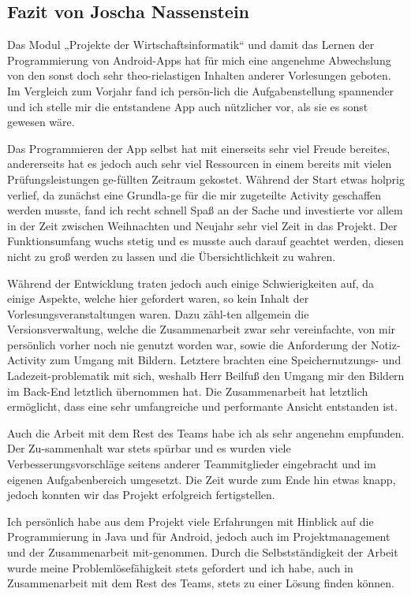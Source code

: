 \subsection{Fazit von Joscha Nassenstein}

Das Modul „Projekte der Wirtschaftsinformatik“ und damit das Lernen der Programmierung von Android-Apps hat für mich eine angenehme Abwechslung von den sonst doch sehr theo-rielastigen Inhalten anderer Vorlesungen geboten. Im Vergleich zum Vorjahr fand ich persön-lich die Aufgabenstellung spannender und ich stelle mir die entstandene App auch nützlicher vor, als sie es sonst gewesen wäre.

Das Programmieren der App selbst hat mit einerseits sehr viel Freude bereites, andererseits hat es jedoch auch sehr viel Ressourcen in einem bereits mit vielen Prüfungsleistungen ge-füllten Zeitraum gekostet. Während der Start etwas holprig verlief, da zunächst eine Grundla-ge für die mir zugeteilte Activity geschaffen werden musste, fand ich recht schnell Spaß an der Sache und investierte vor allem in der Zeit zwischen Weihnachten und Neujahr sehr viel Zeit in das Projekt. Der Funktionsumfang wuchs stetig und es musste auch darauf geachtet werden, diesen nicht zu groß werden zu lassen und die Übersichtlichkeit zu wahren.

Während der Entwicklung traten jedoch auch einige Schwierigkeiten auf, da einige Aspekte, welche hier gefordert waren, so kein Inhalt der Vorlesungsveranstaltungen waren. Dazu zähl-ten allgemein die Versionsverwaltung, welche die Zusammenarbeit zwar sehr vereinfachte, von mir persönlich vorher noch nie genutzt worden war, sowie die Anforderung der Notiz-Activity zum Umgang mit Bildern. Letztere brachten eine Speichernutzungs- und Ladezeit-problematik mit sich, weshalb Herr Beilfuß den Umgang mir den Bildern im Back-End letztlich übernommen hat. Die Zusammenarbeit hat letztlich ermöglicht, dass eine sehr umfangreiche und performante Ansicht entstanden ist.

Auch die Arbeit mit dem Rest des Teams habe ich als sehr angenehm empfunden. Der Zu-sammenhalt war stets spürbar und es wurden viele Verbesserungsvorschläge seitens anderer Teammitglieder eingebracht und im eigenen Aufgabenbereich umgesetzt. Die Zeit wurde zum Ende hin etwas knapp, jedoch konnten wir das Projekt erfolgreich fertigstellen.

Ich persönlich habe aus dem Projekt viele Erfahrungen mit Hinblick auf die Programmierung in Java und für Android, jedoch auch im Projektmanagement und der Zusammenarbeit mit-genommen. Durch die Selbstständigkeit der Arbeit wurde meine Problemlösefähigkeit stets gefordert und ich habe, auch in Zusammenarbeit mit dem Rest des Teams, stets zu einer Lösung finden können.

